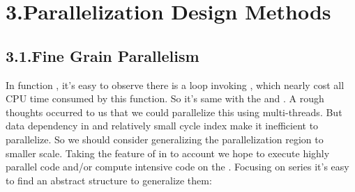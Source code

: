 \documentclass{article}
\begin{document}
\section{3.\hspace*{0.5em}Parallelization Design Methods}\label{sec-parallelization-design-methods}%

\subsection{3.1.\hspace*{0.5em}Fine Grain Parallelism}\label{sec-fine-grain-parallelism}%

\noindent{}In function , it's easy to observe there is a loop invoking , which nearly cost all CPU time consumed by this function. So it's same with the  and . A rough thoughts occurred to us that we could parallelize this  using multi-threads. But data dependency in  and relatively small cycle index make it inefficient to parallelize. So   we should consider generalizing the parallelization region to smaller scale. Taking the feature of  in to account we hope to execute highly parallel code and/or compute intensive code on the . Focusing on  series it's easy to find an abstract structure to generalize them:%
\end{document}
